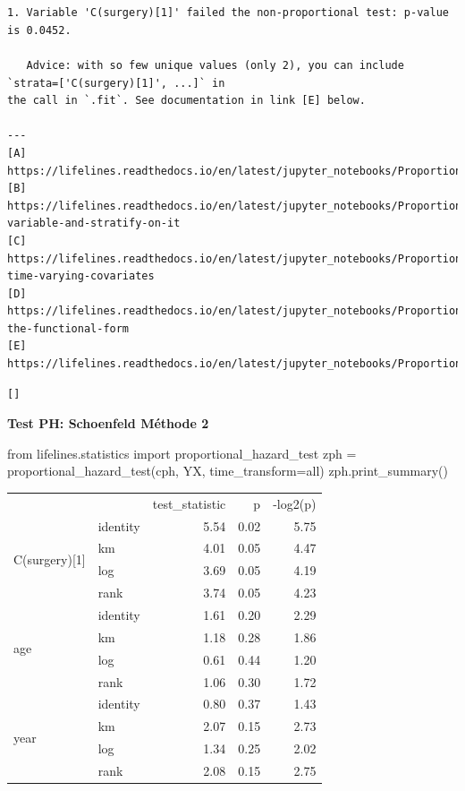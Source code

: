 \documentclass[
  12pt,
  letterpaper,
  DIV=11,
  numbers=noendperiod,
  onepage,
  openany]{scrreprt}
\newenvironment{Shaded}{\begin{snugshade}}{\end{snugshade}}
\newcommand{\ImportTok}[1]{\textcolor[rgb]{0.80,0.80,0.80}{#1}}
\newcommand{\NormalTok}[1]{\textcolor[rgb]{0.80,0.80,0.80}{#1}}
\newcommand{\OperatorTok}[1]{\textcolor[rgb]{0.94,0.94,0.82}{#1}}
\newcommand{\StringTok}[1]{\textcolor[rgb]{0.80,0.58,0.58}{#1}}
\begin{document}
\begin{verbatim}


1. Variable 'C(surgery)[1]' failed the non-proportional test: p-value is 0.0452.

   Advice: with so few unique values (only 2), you can include `strata=['C(surgery)[1]', ...]` in
the call in `.fit`. See documentation in link [E] below.

---
[A]  https://lifelines.readthedocs.io/en/latest/jupyter_notebooks/Proportional%20hazard%20assumption.html
[B]  https://lifelines.readthedocs.io/en/latest/jupyter_notebooks/Proportional%20hazard%20assumption.html#Bin-variable-and-stratify-on-it
[C]  https://lifelines.readthedocs.io/en/latest/jupyter_notebooks/Proportional%20hazard%20assumption.html#Introduce-time-varying-covariates
[D]  https://lifelines.readthedocs.io/en/latest/jupyter_notebooks/Proportional%20hazard%20assumption.html#Modify-the-functional-form
[E]  https://lifelines.readthedocs.io/en/latest/jupyter_notebooks/Proportional%20hazard%20assumption.html#Stratification
\end{verbatim}

\begin{verbatim}
[]
\end{verbatim}

\textbf{Test PH: Schoenfeld Méthode 2}

\begin{Shaded}
\begin{Highlighting}[]
\ImportTok{from}\NormalTok{ lifelines.statistics }\ImportTok{import}\NormalTok{  proportional\_hazard\_test }
\NormalTok{zph }\OperatorTok{=}\NormalTok{ proportional\_hazard\_test(cph, YX, time\_transform}\OperatorTok{=}\StringTok{\textquotesingle{}all\textquotesingle{}}\NormalTok{)}
\NormalTok{zph.print\_summary()}
\end{Highlighting}
\end{Shaded}

\begin{tabular}{llrrr}
 &  & test_statistic & p & -log2(p) \\
\multirow[c]{4}{*}{C(surgery)[1]} & identity & 5.54 & 0.02 & 5.75 \\
 & km & 4.01 & 0.05 & 4.47 \\
 & log & 3.69 & 0.05 & 4.19 \\
 & rank & 3.74 & 0.05 & 4.23 \\
\multirow[c]{4}{*}{age} & identity & 1.61 & 0.20 & 2.29 \\
 & km & 1.18 & 0.28 & 1.86 \\
 & log & 0.61 & 0.44 & 1.20 \\
 & rank & 1.06 & 0.30 & 1.72 \\
\multirow[c]{4}{*}{year} & identity & 0.80 & 0.37 & 1.43 \\
 & km & 2.07 & 0.15 & 2.73 \\
 & log & 1.34 & 0.25 & 2.02 \\
 & rank & 2.08 & 0.15 & 2.75 \\
\end{tabular}
\end{document}
